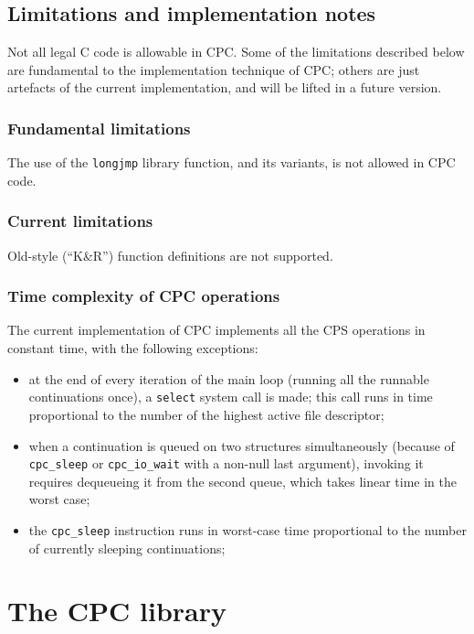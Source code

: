 \documentclass[a4paper]{report}
\begin{document}
\section{Limitations and implementation notes}

Not all legal C code is allowable in CPC.  Some of the limitations
described below are fundamental to the implementation technique of
CPC; others are just artefacts of the current implementation, and will
be lifted in a future version.

\subsection{Fundamental limitations}

The use of the {\tt longjmp} library function, and its variants, is
not allowed in CPC code.

\subsection{Current limitations}

Old-style (``K\&R'') function definitions are not supported.

\subsection{Time complexity of CPC operations}

The current implementation of CPC implements all the CPS operations in
constant time, with the following exceptions:
\begin{itemize} 
\item at the end of every iteration of the main loop (running all the
  runnable continuations once), a {\tt select} system call is made; this
  call runs in time proportional to the number of the highest active file
  descriptor;
\item when a continuation is queued on two structures simultaneously
  (because of {\tt cpc\_sleep} or {\tt cpc\_io\_wait} with a non-null
  last argument), invoking it requires dequeueing it from the second
  queue, which takes linear time in the worst case;
\item the {\tt cpc\_sleep} instruction runs in worst-case time
  proportional to the number of currently sleeping continuations;
\end{itemize}

\chapter{The CPC library}
\end{document}
